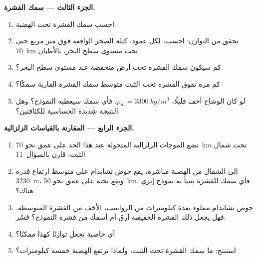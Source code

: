 \begin{problem}
\medskip
\noindent\textbf{الجزء الثالث --- سمك القشرة.}
\begin{enumerate}[resume]
  \item احسب سمك القشرة تحت الهضبة.
  \item تحقق من التوازن: احسب، لكل عمود، كتلة الصخر الواقعة فوق
        متر مربع حتى \qty{70}{km} تحت مستوى سطح البحر، بالأطنان.
  \item كم سيكون سمك القشرة تحت أرض منخفضة عند مستوى سطح البحر؟
  \item كم مرة تفوق القشرة تحت التبت متوسط سمك القشرة القارية
        سمكًا؟
  \item لو كان الوشاح أخف قليلًا، $\rho_m = \qty{3300}{kg/m^3}$،
        فأي سمك سيعطيه النموذج؟ وهل النتيجة شديدة الحساسية
        للكثافتين؟
\end{enumerate}

\medskip
\noindent\textbf{الجزء الرابع --- المقارنة بالقياسات الزلزالية.}
\begin{enumerate}[resume]
  \item تضع الموجات الزلزالية المتحولة عند  هذا الحد على عمق نحو \qty{70}{km}
        تحت شمال التبت. قارن بالسؤال~11.
  \item إلى الشمال من الهضبة مباشرة، يقع حوض تشايدام على متوسط
        ارتفاع قدره \qty{3230}{m}، ويقع  تحته على عمق نحو \qty{50}{km}.
        فأي سمك للقشرة يتنبأ به نموذج إيري هناك؟
  \item حوض تشايدام مملوء بعدة كيلومترات من الرواسب،
        الأخف من القشرة المتوسطة. فهل يجعل ذلك القشرة الحقيقية أرق أم
        أسمك من قشرة النموذج؟ فسّر.
  \item أي خاصية  تجعل توازنًا كهذا ممكنًا؟
  \item استنتج: ما سمك القشرة تحت التبت، ولماذا ترتفع
        الهضبة خمسة كيلومترات؟
\end{enumerate}
\end{problem}

